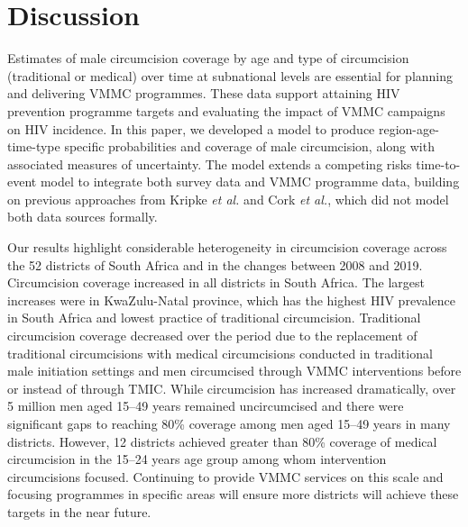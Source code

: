 \documentclass{article}
\begin{document}

\section*{Discussion}


Estimates of male circumcision coverage by age and type of circumcision (traditional or medical) over time at subnational levels are essential for planning and delivering VMMC programmes. These data support attaining HIV prevention programme targets and evaluating the impact of VMMC campaigns on HIV incidence. In this paper, we developed a model to produce region-age-time-type specific probabilities and  coverage of male circumcision, along with associated measures of uncertainty. The model extends a competing risks time-to-event model to integrate both survey data and VMMC programme data, building on previous approaches from Kripke \textit{et al.} \cite{kripke2016cost} and Cork \textit{et al.}\cite{cork2020mapping}, which did not model both data sources formally.

Our results highlight considerable heterogeneity in circumcision coverage across the 52 districts of South Africa and in the changes between 2008 and 2019. Circumcision coverage increased in all districts in South Africa. The largest increases were in KwaZulu-Natal province, which has the highest HIV prevalence in South Africa and lowest practice of traditional circumcision. Traditional circumcision coverage decreased over the period due to the replacement of traditional circumcisions with medical circumcisions conducted in traditional male initiation settings and men circumcised through VMMC interventions before or instead of through TMIC. While circumcision has increased dramatically, over 5 million men aged 15--49 years remained uncircumcised and there were significant gaps to reaching 80\% coverage among men aged 15--49 years in many districts. However, 12 districts achieved greater than 80\% coverage of medical circumcision in the 15--24 years age group among whom intervention circumcisions focused. Continuing to provide VMMC services on this scale and focusing programmes in specific areas will ensure more districts will achieve these targets in the near future. 
\end{document}
